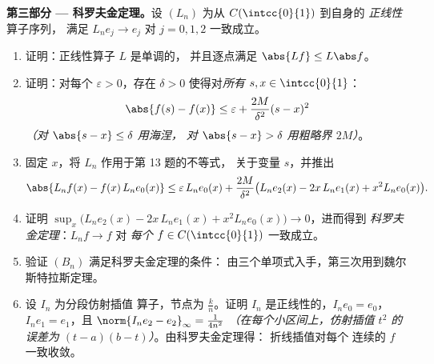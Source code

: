 \begin{problem}
\medskip
\noindent\textbf{第三部分 --- 科罗夫金定理。}设 $(L_n)$
        为从 $C(\intcc{0}{1})$ 到自身的 \emph{正线性}算子序列，
        满足 $L_ne_j \to e_j$
        对 $j = 0, 1, 2$ 一致成立。
\begin{enumerate}[resume]
  \item 证明：正线性算子 $L$ 是单调的，
        并且逐点满足 $\abs{Lf} \leq L\abs f$。
  \item 证明：对每个 $\varepsilon > 0$，存在 $\delta > 0$
        使得对\emph{所有} $s, x \in \intcc{0}{1}$：
        \[
        \abs{f(s) - f(x)} \leq \varepsilon +
        \frac{2M}{\delta^2}(s - x)^2
        \]
        \emph{（对 $\abs{s - x} \leq \delta$ 用海涅，
        对 $\abs{s-x} > \delta$ 用粗略界 $2M$）}。
  \item 固定 $x$，将 $L_n$ 作用于第 13 题的不等式，
        关于变量 $s$，并推出
        \[
        \abs{L_nf(x) - f(x)\,L_ne_0(x)}
        \leq \varepsilon\,L_ne_0(x) + \frac{2M}{\delta^2}
        \bigl(L_ne_2(x) - 2x\,L_ne_1(x) + x^2 L_ne_0(x)\bigr).
        \]
  \item 证明 $\sup_x \bigl(L_ne_2(x) - 2x\,L_ne_1(x) + x^2
        L_ne_0(x)\bigr) \to 0$，进而得到
        \emph{科罗夫金定理}：$L_nf \to f$ 对
        \emph{每个} $f \in C(\intcc{0}{1})$ 一致成立。
  \item 验证 $(B_n)$ 满足科罗夫金定理的条件：
        由三个单项式入手，第三次用到魏尔斯特拉斯定理。
  \item 设 $I_n$ 为分段仿射插值
        算子，节点为 $\frac kn$。证明 $I_n$
        是正线性的，$I_ne_0 = e_0$，$I_ne_1 = e_1$，且
        $\norm{I_ne_2 - e_2}_\infty = \frac{1}{4n^2}$
        \emph{（在每个小区间上，仿射插值 $t^2$ 的误差为
        $(t - a)(b - t)$）}。由科罗夫金定理得：
        折线插值对每个
        连续的 $f$ 一致收敛。
\end{enumerate}


\end{problem}
